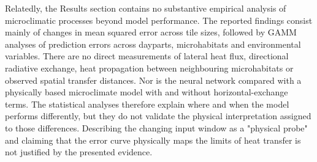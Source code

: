 \documentclass[12pt,english]{reviewresponse}
\begin{document}
\addtocounter{revcomment}{-1}
\begin{revcomment}[adjusted title={Comment 1 (Part 2)}]
Relatedly, the Results section contains no substantive empirical analysis of microclimatic processes beyond model performance. The reported findings consist mainly of changes in mean squared error across tile sizes, followed by GAMM analyses of prediction errors across dayparts, microhabitats and environmental variables. There are no direct measurements of lateral heat flux, directional radiative exchange, heat propagation between neighbouring microhabitats or observed spatial transfer distances. Nor is the neural network compared with a physically based microclimate model with and without horizontal-exchange terms. The statistical analyses therefore explain where and when the model performs differently, but they do not validate the physical interpretation assigned to those differences. Describing the changing input window as a "physical probe" and claiming that the error curve physically maps the limits of heat transfer is not justified by the presented evidence.
\end{revcomment}
\end{document}
